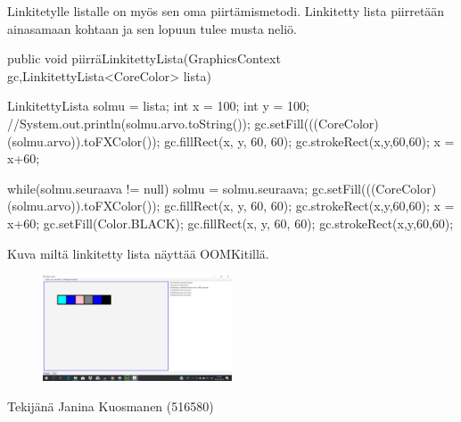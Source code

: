 Linkitetylle listalle on myös sen oma piirtämismetodi. Linkitetty lista piirretään ainasamaan kohtaan ja sen lopuun tulee 
musta neliö. 

\begin{javacode}

public void piirräLinkitettyLista(GraphicsContext gc,LinkitettyLista<CoreColor> lista) {
            	LinkitettyLista solmu = lista;
            	int x = 100;
                int y = 100;
        		//System.out.println(solmu.arvo.toString());
            	gc.setFill(((CoreColor)(solmu.arvo)).toFXColor());
            	gc.fillRect(x, y, 60, 60);
            	gc.strokeRect(x,y,60,60);
            	x = x+60;
        		
        		while(solmu.seuraava != null) {
        			solmu = solmu.seuraava;
        			gc.setFill(((CoreColor)(solmu.arvo)).toFXColor());
                	gc.fillRect(x, y, 60, 60);
                	gc.strokeRect(x,y,60,60);
                	x = x+60;
        		}
        		gc.setFill(Color.BLACK);
            	gc.fillRect(x, y, 60, 60);
            	gc.strokeRect(x,y,60,60);
            	
            }
	    
	    
\end{javacode}
Kuva miltä linkitetty lista näyttää OOMKitillä.


\begin{figure}
\centering \includegraphics[width=0.5\textwidth]{kuvat/LinkitettyLista}
\label{LinkitettyLista} 
\end{figure}





Tekijänä Janina Kuosmanen (516580)

\label{endofpages}
